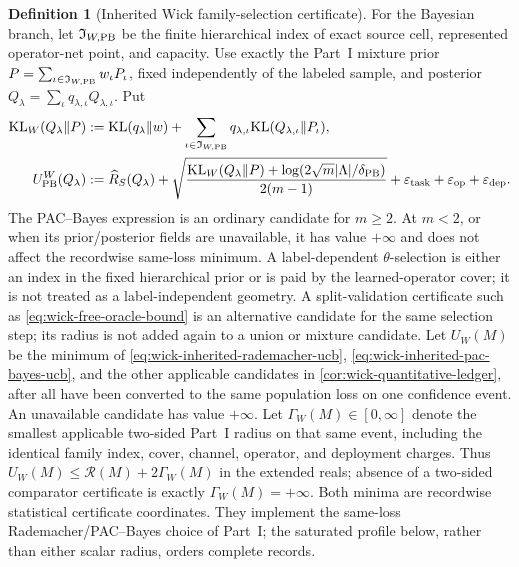 \documentclass[11pt]{article}
\numberwithin{section}{part}
\theoremstyle{plain}
\theoremstyle{definition}
\newtheorem{definition}[definition]{Definition}
\theoremstyle{remark}
\begin{document}
\begin{definition}[Inherited Wick family-selection certificate]
For the Bayesian branch, let \(\mathfrak I_{W,\rm PB}\) be the finite
hierarchical index of exact source cell, represented operator-net point, and
capacity.  Use exactly the Part~I mixture prior
\(P=\sum_{\iota\in\mathfrak I_{W,\rm PB}}w_\iota P_\iota\), fixed
independently of the labeled sample, and posterior
\(Q_\lambda=\sum_\iota q_{\lambda,\iota}Q_{\lambda,\iota}\).  Put
\begin{align}
 \label{eq:wick-inherited-mixture-kl}
 \operatorname{KL}_W(Q_\lambda\Vert P)
 &:={\rm KL}(q_\lambda\Vert w)
 +\sum_{\iota\in\mathfrak I_{W,\rm PB}}q_{\lambda,\iota}
   {\rm KL}(Q_{\lambda,\iota}\Vert P_\iota),\\
 \label{eq:wick-inherited-pac-bayes-ucb}
 U_{\rm PB}^W(Q_\lambda)
 &:=\widehat R_S(Q_\lambda)
 +\sqrt{\frac{\operatorname{KL}_W(Q_\lambda\Vert P)
 +\log(2\sqrt m|\Lambda|/\delta_{\rm PB})}{2(m-1)}}
 +\varepsilon_{\rm task}+\varepsilon_{\rm op}+\varepsilon_{\rm dep}.
\end{align}
The PAC--Bayes expression is an ordinary candidate for \(m\ge2\).  At
\(m<2\), or when its prior/posterior fields are unavailable, it has value
\(+\infty\) and does not affect the recordwise same-loss minimum.
A label-dependent \(\theta\)-selection is either an index in the fixed
hierarchical prior or is paid by the learned-operator cover; it is not treated
as a label-independent geometry.  A split-validation certificate such as
\eqref{eq:wick-free-oracle-bound} is an alternative candidate for the same
selection step; its radius is not added again to a union or mixture candidate.
Let \(U_W(M)\) be the minimum of
\eqref{eq:wick-inherited-rademacher-ucb},
\eqref{eq:wick-inherited-pac-bayes-ucb}, and the other applicable candidates
in \cref{cor:wick-quantitative-ledger}, after all have been converted to the
same population loss on one confidence event.  An unavailable candidate has
value \(+\infty\).  Let \(\Gamma_W(M)\in[0,\infty]\) denote the smallest applicable
two-sided Part~I radius on that same event, including the identical family
index, cover, channel, operator, and deployment charges.  Thus
\(U_W(M)\le\mathcal R(M)+2\Gamma_W(M)\) in the extended reals; absence of a
two-sided comparator certificate is exactly \(\Gamma_W(M)=+\infty\).
Both minima are recordwise statistical certificate coordinates.  They
implement the same-loss Rademacher/PAC--Bayes choice of Part~I; the saturated
profile below, rather than either scalar radius, orders complete records.
\end{definition}
\end{document}
